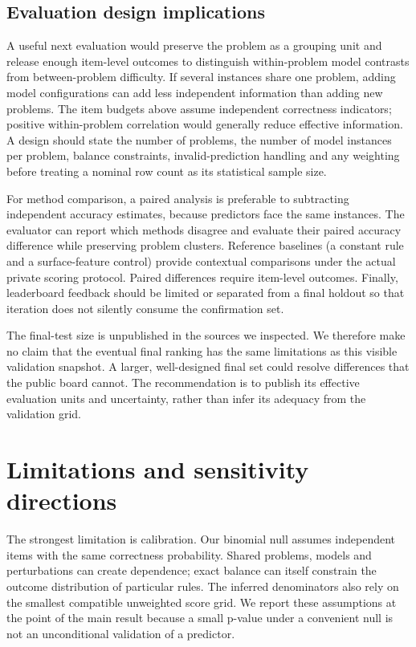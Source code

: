\subsection{Evaluation design implications}

A useful next evaluation would preserve the problem as a grouping unit and release enough item-level outcomes to distinguish within-problem model contrasts from between-problem difficulty. If several instances share one problem, adding model configurations can add less independent information than adding new problems. The item budgets above assume independent correctness indicators; positive within-problem correlation would generally reduce effective information. A design should state the number of problems, the number of model instances per problem, balance constraints, invalid-prediction handling and any weighting before treating a nominal row count as its statistical sample size.


For method comparison, a paired analysis is preferable to subtracting independent accuracy estimates, because predictors face the same instances. The evaluator can report which methods disagree and evaluate their paired accuracy difference while preserving problem clusters. Reference baselines (a constant rule and a surface-feature control) provide contextual comparisons under the actual private scoring protocol. Paired differences require item-level outcomes. Finally, leaderboard feedback should be limited or separated from a final holdout so that iteration does not silently consume the confirmation set.


The final-test size is unpublished in the sources we inspected. We therefore make no claim that the eventual final ranking has the same limitations as this visible validation snapshot. A larger, well-designed final set could resolve differences that the public board cannot. The recommendation is to publish its effective evaluation units and uncertainty, rather than infer its adequacy from the validation grid.


\clearpage

\section*{Limitations and sensitivity directions}

The strongest limitation is calibration. Our binomial null assumes independent items with the same correctness probability. Shared problems, models and perturbations can create dependence; exact balance can itself constrain the outcome distribution of particular rules. The inferred denominators also rely on the smallest compatible unweighted score grid. We report these assumptions at the point of the main result because a small p-value under a convenient null is not an unconditional validation of a predictor.


